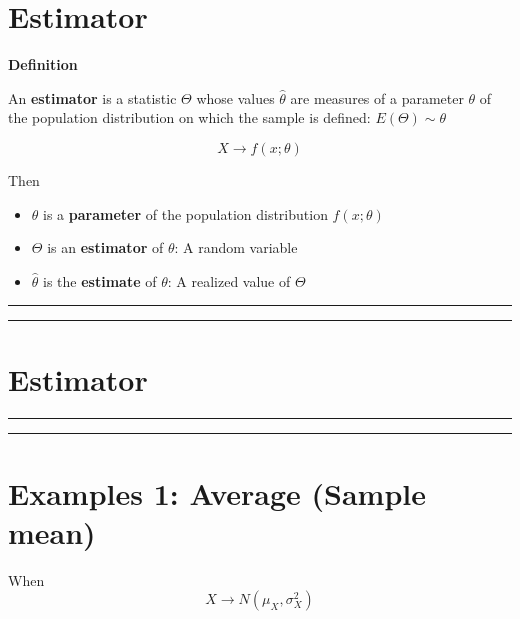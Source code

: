 \documentclass[
]{book}
\providecommand{\tightlist}{%
  \setlength{\itemsep}{0pt}\setlength{\parskip}{0pt}}
\begin{document}
\hypertarget{estimator}{%
\section{Estimator}\label{estimator}}

\textbf{Definition}

An \textbf{estimator} is a statistic \(\Theta\) whose values \(\hat{\theta}\) are measures of a parameter \(\theta\) of the population distribution on which the sample is defined: \(E(\Theta)\sim \theta\)

\[X \rightarrow f(x; \theta)\]

Then

\begin{itemize}
\tightlist
\item
  \(\theta\) is a \textbf{parameter} of the population distribution \(f(x; \theta)\)
\item
  \(\Theta\) is an \textbf{estimator} of \(\theta\): A random variable
\item
  \(\hat{\theta}\) is the \textbf{estimate} of \(\theta\): A realized value of \(\Theta\)
\end{itemize}

\begin{center}\rule{0.5\linewidth}{0.5pt}\end{center}

\begin{center}\rule{0.5\linewidth}{0.5pt}\end{center}

\hypertarget{estimator-1}{%
\section{Estimator}\label{estimator-1}}

\begin{center}\rule{0.5\linewidth}{0.5pt}\end{center}

\begin{center}\rule{0.5\linewidth}{0.5pt}\end{center}

\hypertarget{examples-1-average-sample-mean}{%
\section{Examples 1: Average (Sample mean)}\label{examples-1-average-sample-mean}}

When \[X \rightarrow N(\mu_X, \sigma^2_X)\]
\end{document}
